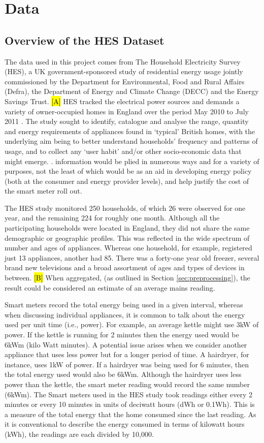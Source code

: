 \chapter{Data}


\section{Overview of the HES Dataset}
The data used in this project comes from The Household Electricity Survey (HES), a UK government-sponsored study of residential energy usage jointly commissioned by the Department for Environmental, Food and Rural Affairs (Defra), the Department of Energy and Climate Change (DECC) and the Energy Savings Trust.   \hl{[A]} HES tracked the electrical power sources and demands  a variety of owner-occupied homes in England over the period May 2010 to July 2011 \cite{HES}. The study sought to identify, catalogue and analyse the range, quantity and energy requirements of appliances found in `typical' British homes, with the underlying aim being to better understand households' frequency and patterns of usage, and to collect any `user habit' and/or other socio-economic data that might emerge. \cite{early_findings}.  information would be plied in numerous ways and for a variety of purposes, not the least of which would be as an aid in developing energy policy (both at the consumer and energy provider levels), and help justify the cost of the smart meter roll out.   

The HES study monitored 250 households, of which 26 were observed for one year, and the remaining 224 for roughly one month. Although all the participating households were located in England, they did not share the same demographic or geographic profiles.   This was reflected in the wide spectrum of number and ages of appliances.  Whereas one household, for example, registered just 13 appliances, another had 85.  There was a forty-one year old freezer, several brand new televisions and a broad assortment of ages and types of devices in between. \hl{[B]}  When aggregated, (as outlined in Section \ref{sec:preprocessing}), the result could be considered an estimate of an average mains reading. 

Smart meters record the total energy being used in a given interval, whereas when discussing individual appliances, it is common to talk about the energy used per unit time (i.e., power). For example, an average kettle might use 3kW of power. If the kettle is running for 2 minutes then the energy used would be 6kWm (kilo Watt minutes). A potential issue arises when we consider another appliance that uses less power but for a longer period of time. A hairdryer, for instance, uses 1kW of power. If a hairdryer was being used for 6 minutes, then the total energy used would also be 6kWm. Although the hairdryer uses less power than the kettle, the smart meter reading would record the same number (6kWm).   The Smart meters used in the HES study took readings either every 2 minutes or every 10 minutes in units of deciwatt hours (dWh or 0.1Wh). This is a measure of the total energy that the home consumed since the last reading. As it is conventional to describe the energy consumed in terms of kilowatt hours (kWh), the readings are each divided by 10,000.

